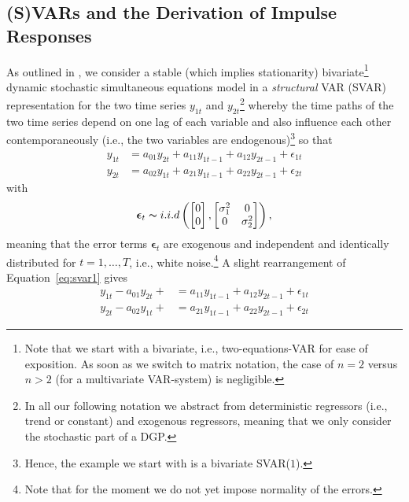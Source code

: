 \documentclass[a4paper,11pt,listof=nochaptergap,oneside,pointednumbers,bibtotoc,bigheadings,liststotoc,hidelinks]{scrbook}
\theoremstyle{mysatz}
\theoremstyle{mydefinition}
\theoremstyle{mytheorem}
\theoremstyle{mybemerkung}
\newcommand{\vect}[1]{\boldsymbol{\mathbf{#1}}}
\begin{document}
\subsection{(S)VARs and the Derivation of Impulse Responses}
\label{sec:SVARsDerviationIRFs}
As outlined in \citet{zivot:00}, we consider a stable (which implies stationarity) bivariate\footnote{Note that we start with a bivariate, i.e., two-equations-VAR for ease of exposition. As soon as we switch to matrix notation, the case of $n=2$ versus $n>2$ (for a multivariate VAR-system) is negligible.} dynamic stochastic simultaneous equations model in a \textit{structural} VAR (SVAR) representation for the two time series $y_{1t}$ and $y_{2t}$\footnote{In all our following notation we abstract from deterministic regressors (i.e., trend or constant) and exogenous regressors, meaning that we only consider the stochastic part of a DGP.} whereby the time paths of the two time series depend on one lag of each variable and also influence each other contemporaneously (i.e., the two variables are endogenous)\footnote{Hence, the example we start with is a bivariate SVAR($1$).} so that
\begin{equation} \label{eq:svar1}
\begin{split}
	y_{1t} & = a_{01}y_{2t} + a_{11}y_{1t-1} + a_{12}y_{2t-1} + \epsilon_{1t} \\
	y_{2t} & = a_{02}y_{1t} + a_{21}y_{1t-1} + a_{22}y_{2t-1} + \epsilon_{2t}
\end{split}								
\end{equation}
with 
\begin{equation}
\begin{split}
	\vect{\epsilon}_t \thicksim i.i.d \left (  \begin{bmatrix}
    							0 \\
    							0
 							 \end{bmatrix}, \begin{bmatrix}
    							\sigma_{1}^2 & 0  \\
    							0 & \sigma_{2}^2
 							 \end{bmatrix} \right ),
\end{split}								
\end{equation}
meaning that the error terms $\vect{\epsilon}_t$ are exogenous and independent and identically distributed  for $t = 1, \dots, T$, i.e., white noise.\footnote{Note that for the moment we do not yet impose normality of the errors.} A slight rearrangement of Equation~\ref{eq:svar1} gives 
\begin{equation} \label{eq:svar2}
\begin{split}
	y_{1t} - a_{01}y_{2t} + & = a_{11}y_{1t-1} + a_{12}y_{2t-1} + \epsilon_{1t} \\
	y_{2t} - a_{02}y_{1t} +  & = a_{21}y_{1t-1} + a_{22}y_{2t-1} + \epsilon_{2t}
\end{split}								
\end{equation}
\end{document}
